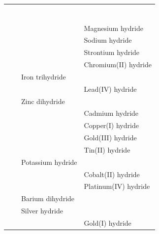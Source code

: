 \begin{landscape}
\begin{longtable}{@{}c C{2cm} C{12cm} C{12cm}@{}}
            \myorder{} &  & \rojo{} & \rojo{} \\[3pt]
            \myorder{} &  & \rojo{} & \rojo{} \\[3pt]
            \myorder{} &  & \rojo{} & \rojo{} \\[3pt]
            \myorder{} &  & \rojo{} & \rojo{} \\[3pt]
            \myorder{} &  & \rojo{} & \rojo{} \\[3pt]
            \myorder{} &  & \rojo{} & \rojo{} \\[3pt]
            \myorder{} &  & \rojo{} & \rojo{} \\[3pt]
            \myorder{} & \rojo{\ch{}} & \rojo{} & Magnesium hydride \\[3pt]
            \myorder{} & \rojo{\ch{}} & \rojo{} & Sodium hydride \\[3pt]
            \myorder{} & \rojo{\ch{}} & \rojo{} & Strontium hydride \\[3pt]
            \myorder{} & \rojo{\ch{}} & \rojo{} & Chromium(II) hydride \\[3pt]
            \myorder{} & \rojo{\ch{}} & Iron trihydride & \rojo{} \\[3pt]
            \myorder{} & \rojo{\ch{}} & \rojo{} & Lead(IV) hydride \\[3pt]
            \myorder{} & \rojo{\ch{}} & Zinc dihydride & \rojo{} \\[3pt]
            \myorder{} & \rojo{\ch{}} & \rojo{} & Cadmium hydride \\[3pt]
            \myorder{} & \rojo{\ch{}} & \rojo{} & Copper(I) hydride \\[3pt]
            \myorder{} & \rojo{\ch{}} & \rojo{} & Gold(III) hydride \\[3pt]
            \myorder{} & \rojo{\ch{}} & \rojo{} & Tin(II) hydride \\[3pt]
            \myorder{} & \rojo{\ch{}} & Potassium hydride & \rojo{} \\[3pt]
            \myorder{} & \rojo{\ch{}} & \rojo{} & Cobalt(II) hydride \\[3pt]
            \myorder{} & \rojo{\ch{}} & \rojo{} & Platinum(IV) hydride \\[3pt]
            \myorder{} & \rojo{\ch{}} & Barium dihydride & \rojo{} \\[3pt]
            \myorder{} & \rojo{\ch{}} & Silver hydride & \rojo{} \\[3pt]
            \myorder{} & \rojo{\ch{}} & \rojo{} & Gold(I) hydride \\[3pt]

\end{longtable}
\end{landscape}

